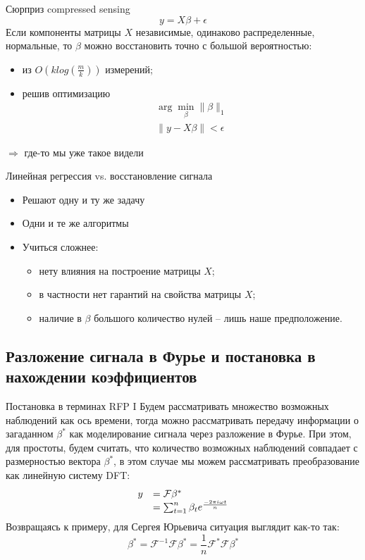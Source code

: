 \documentclass[14pt, fleqn, xcolor={dvipsnames, table}]{beamer}
\begin{document}
\begin{frame}{Сюрприз compressed sensing}
\small
$$
y = X\beta + \epsilon
$$
Если компоненты матрицы $X$ независимые, одинаково распределенные, нормальные, то $\beta$ можно восстановить точно с большой вероятностью:
\begin{itemize}
  \item из $O(k log(\frac{m}{k}))$ измерений;
  \item решив оптимизацию
    $$\begin{array}{l}
    \arg \min_\beta\|\beta\|_1\\
    \|y - X\beta\| < \epsilon
    \end{array}$$
\end{itemize}
$\Rightarrow$ где-то мы уже такое видели
\end{frame}

\begin{frame}{Линейная регрессия vs. восстановление сигнала}
\begin{itemize}
  \item Решают одну и ту же задачу
  \item Одни и те же алгоритмы
  \item Учиться сложнее:
  \begin{itemize}
    \item нету влияния на построение матрицы $X$;
    \item в частности нет гарантий на свойства матрицы $X$;
    \item наличие в $\beta$ большого количество нулей -- лишь наше предположение.
  \end{itemize}
\end{itemize}
\end{frame}

\subsection{Разложение сигнала в Фурье и постановка в нахождении коэффициентов}
\begin{frame}{Постановка в терминах RFP I}
\small
Будем рассматривать множество возможных наблюдений как ось времени, тогда можно рассматривать передачу информации о загаданном $\beta^*$ как моделирование сигнала через разложение в Фурье. При этом, для простоты, будем считать, что количество возможных наблюдений совпадает с размерностью вектора $\beta^*$, в этом случае мы можем рассматривать преобразование как линейную систему DFT: 
$$\begin{array}{rl}
y & = \mathcal{F} \beta^* \\
& = \sum_{t = 1}^n \beta_t e^{-2\pi i \omega t \over n}
\end{array}$$
Возвращаясь к примеру, для Сергея Юрьевича ситуация выглядит как-то так:
$$
\beta^* = \mathcal{F}^{-1} \mathcal{F} \beta^* = \frac{1}{n}\mathcal{F^*} \mathcal{F} \beta^*
$$
\end{frame}
\end{document}
